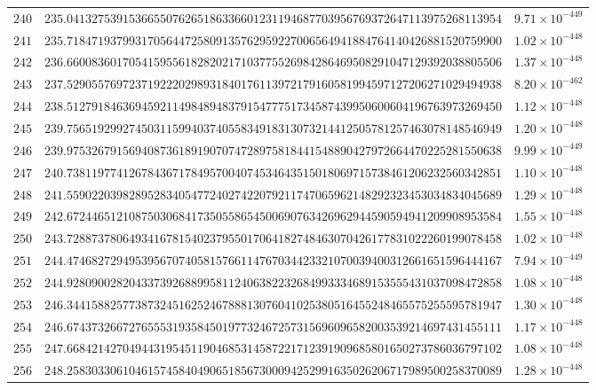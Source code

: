 \documentclass[12pt,reqno]{amsart}
\theoremstyle{remark}
\begin{document}
\begin{longtable}{clc}
$240$ & $235.0413275391536655076265186336601231194687703956769372647113975268113954$ & $9.71\times 10^{-449}$ \\
$241$ & $235.7184719379931705644725809135762959227006564941884764140426881520759900$ & $1.02\times 10^{-448}$ \\
$242$ & $236.6600836017054159556182820217103775526984286469508291047129392038805506$ & $1.37\times 10^{-448}$ \\
$243$ & $237.5290557697237192220298931840176113972179160581994597127206271029494938$ & $8.20\times 10^{-462}$ \\
$244$ & $238.5127918463694592114984894837915477751734587439950600604196763973269450$ & $1.12\times 10^{-448}$ \\
$245$ & $239.7565192992745031159940374055834918313073214412505781257463078148546949$ & $1.20\times 10^{-448}$ \\
$246$ & $239.9753267915694087361891907074728975818441548890427972664470225281550638$ & $9.99\times 10^{-449}$ \\
$247$ & $240.7381197741267843671784957004074534643515018069715738461206232560342851$ & $1.10\times 10^{-448}$ \\
$248$ & $241.5590220398289528340547724027422079211747065962148292323453034834045689$ & $1.29\times 10^{-448}$ \\
$249$ & $242.6724465121087503068417350558654500690763426962944590594941209908953584$ & $1.55\times 10^{-448}$ \\
$250$ & $243.7288737806493416781540237955017064182748463070426177831022260199078458$ & $1.02\times 10^{-448}$ \\
$251$ & $244.4746827294953956707405815766114767034423321070039400312661651596444167$ & $7.94\times 10^{-449}$ \\
$252$ & $244.9280900282043373926889958112406382232684993334689153555431037098472858$ & $1.08\times 10^{-448}$ \\
$253$ & $246.3441588257738732451625246788813076041025380516455248465575255595781947$ & $1.30\times 10^{-448}$ \\
$254$ & $246.6743732667276555319358450197732467257315696096582003539214697431455111$ & $1.17\times 10^{-448}$ \\
$255$ & $247.6684214270494431954511904685314587221712391909685801650273786036797102$ & $1.08\times 10^{-448}$ \\
$256$ & $248.2583033061046157458404906518567300094252991635026206717989500258370089$ & $1.28\times 10^{-448}$ \\

\end{longtable}
\end{document}
